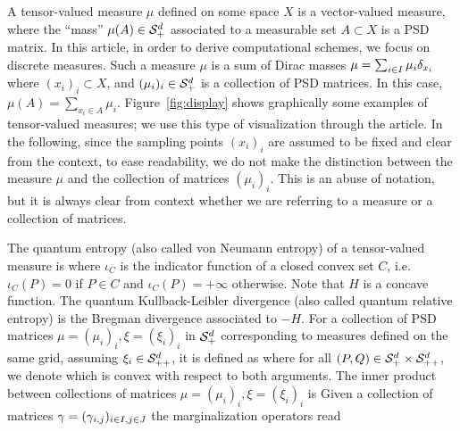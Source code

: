 A tensor-valued measure $\mu$ defined on some space $X$ is a vector-valued measure, where the ``mass'' $\mu(A) \in \mathcal{S}_+^d$ associated to a measurable set $A \subset X$ is a PSD matrix. In this article, in order to derive computational schemes, we focus on discrete measures. Such a measure $\mu$ is a sum of Dirac masses
$\mu = \sum_{i \in I} \mu_i \delta_{x_i}$
where $(x_i)_i \subset X$, and $(\mu_i)_i \in \mathcal{S}_+^d$ is a collection of PSD matrices. In this case, $\mu(A)=\sum_{x_i \in A} \mu_i$. 
%
Figure~\ref{fig:display} shows graphically some examples of tensor-valued measures; we use this type of visualization through the article. 
%
In the following, since the sampling points $(x_i)_i$ are assumed to be fixed and clear from the context, to ease readability, we do not make the distinction between the measure $\mu$ and the collection of matrices $(\mu_i)_i$. This is an abuse of notation, but it is always clear from context whether we are referring to a measure or a collection of matrices. 

The quantum entropy (also called von Neumann entropy) of a tensor-valued measure is 
where $\iota_C$ is the indicator function of a closed convex set $C$, i.e. $\iota_C(P)=0$ if $P \in C$ and $\iota_C(P)=+\infty$ otherwise.
Note that $H$ is a concave function. 
%
The quantum Kullback-Leibler divergence (also called quantum relative entropy) is the Bregman divergence associated to $-H$. For a collection of PSD matrices $\mu=(\mu_i)_i, \xi=(\xi_i)_i$ in $\mathcal{S}_+^d$ corresponding to measures defined on the same grid, assuming $\xi_i \in \mathcal{S}_{++}^d$, it is defined as
where for all $(P,Q) \in \mathcal{S}_{+}^d \times \mathcal{S}_{++}^d$, we denote
which is convex with respect to both arguments. 
%
The inner product between collections of matrices $\mu=(\mu_i)_i, \xi=(\xi_i)_i$ is 
Given a collection of matrices $\gamma=(\gamma_{i,j})_{i \in I,j \in J}$ the marginalization operators read
